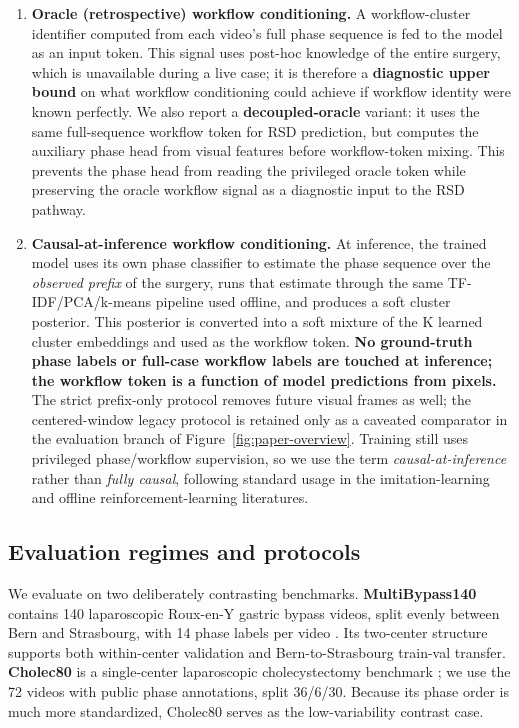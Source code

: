 \begin{enumerate}
\def\labelenumi{\arabic{enumi}.}
\item
  \textbf{Oracle (retrospective) workflow conditioning.} A
  workflow-cluster identifier computed from each video's full phase
  sequence is fed to the model as an input token. This signal uses
  post-hoc knowledge of the entire surgery, which is unavailable during
  a live case; it is therefore a \textbf{diagnostic upper bound} on what
  workflow conditioning could achieve if workflow identity were known
  perfectly. We also report a \textbf{decoupled-oracle} variant: it uses
  the same full-sequence workflow token for RSD prediction, but computes
  the auxiliary phase head from visual features before workflow-token
  mixing. This prevents the phase head from reading the privileged
  oracle token while preserving the oracle workflow signal as a
  diagnostic input to the RSD pathway.
\item
  \textbf{Causal-at-inference workflow conditioning.} At inference, the
  trained model uses its own phase classifier to estimate the phase
  sequence over the \emph{observed prefix} of the surgery, runs that
  estimate through the same TF-IDF/PCA/k-means pipeline used offline,
  and produces a soft cluster posterior. This posterior is converted
  into a soft mixture of the K learned cluster embeddings and used as
  the workflow token. \textbf{No ground-truth phase labels or full-case
  workflow labels are touched at inference; the workflow token is a
  function of model predictions from pixels.} The strict prefix-only
  protocol removes future visual frames as well; the centered-window
  legacy protocol is retained only as a caveated comparator in the
  evaluation branch of Figure~\ref{fig:paper-overview}. Training still
  uses privileged phase/workflow supervision, so we use the term
  \emph{causal-at-inference} rather than \emph{fully causal}, following
  standard usage in the imitation-learning and offline
  reinforcement-learning literatures.
\end{enumerate}

\subsection{Evaluation regimes and protocols}\label{datasets-and-evaluation-protocols} 

We evaluate on two deliberately contrasting benchmarks.
\textbf{MultiBypass140} contains 140 laparoscopic Roux-en-Y gastric
bypass videos, split evenly between Bern and Strasbourg, with 14 phase
labels per video \citep{lavanchy2024multibypass}. Its two-center
structure supports both within-center validation and Bern-to-Strasbourg
train-val transfer. \textbf{Cholec80} is a single-center laparoscopic
cholecystectomy benchmark \citep{twinanda2017endonet}; we use the 72
videos with public phase annotations, split 36/6/30. Because its phase
order is much more standardized, Cholec80 serves as the low-variability
contrast case.

